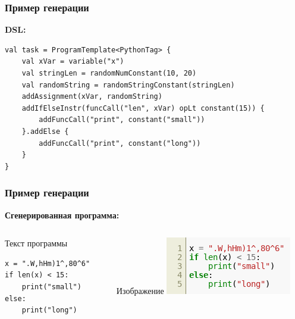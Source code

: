 \documentclass[14pt,aspectratio=169,hyperref={pdftex,unicode},xcolor=dvipsnames]{beamer}
\begin{document}
\begin{frame}[fragile]
    \frametitle{Пример генерации}
    \textbf{DSL:}
    \begin{verbatim}
val task = ProgramTemplate<PythonTag> {
    val xVar = variable("x")
    val stringLen = randomNumConstant(10, 20)
    val randomString = randomStringConstant(stringLen)
    addAssignment(xVar, randomString)
    addIfElseInstr(funcCall("len", xVar) opLt constant(15)) {
        addFuncCall("print", constant("small"))
    }.addElse {
        addFuncCall("print", constant("long"))
    }
}
\end{verbatim}
\end{frame}

\begin{frame}[fragile]
    \frametitle{Пример генерации}
    \textbf{Сгенерированная программа:}\\
    \begin{columns}
        \begin{column}{0.45\textwidth}
            Текст программы
            \begin{verbatim}
x = ".W,hHm)1^,80^6"
if len(x) < 15:
    print("small")
else:
    print("long")
            \end{verbatim}
        \end{column}
        \begin{column}{0.45\textwidth}
            Изображение
            \includegraphics[width=\textwidth]{images/code-image.png}
        \end{column}

    \end{columns}
\end{frame}
\end{document}
